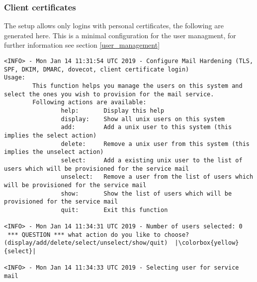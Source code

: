  \subsubsection{Client certificates}
 The setup allows only logins with personal certificates, the following are generated here.
 This is a minimal configuration for the user managment, for further information see section \ref{user_management}
 \begin{lstlisting}[escapeinside=||]    
<INFO> - Mon Jan 14 11:31:54 UTC 2019 - Configure Mail Hardening (TLS, SPF, DKIM, DMARC, dovecot, client certificate login)
Usage:
        This function helps you manage the users on this system and select the ones you wish to provision for the mail service.
        Following actions are available:
                help: 		Display this help
                display: 	Show all unix users on this system
				add: 		Add a unix user to this system (this implies the select action)
                delete: 	Remove a unix user from this system (this implies the unselect action)
                select: 	Add a existing unix user to the list of users which will be provisioned for the service mail
                unselect: 	Remove a user from the list of users which will be provisioned for the service mail
				show: 		Show the list of users which will be provisioned for the service mail
				quit: 		Exit this function
                                                                                                                                                                                                                                                                                                                                              
<INFO> - Mon Jan 14 11:34:31 UTC 2019 - Number of users selected: 0
 *** QUESTION *** what action do you like to choose? (display/add/delete/select/unselect/show/quit)  |\colorbox{yellow}{select}|
                                                                                                                                                                                                                                                                                                                                              
<INFO> - Mon Jan 14 11:34:33 UTC 2019 - Selecting user for service mail
                                                                                                                                                                                                                                                                                                                                              

\end{lstlisting}
